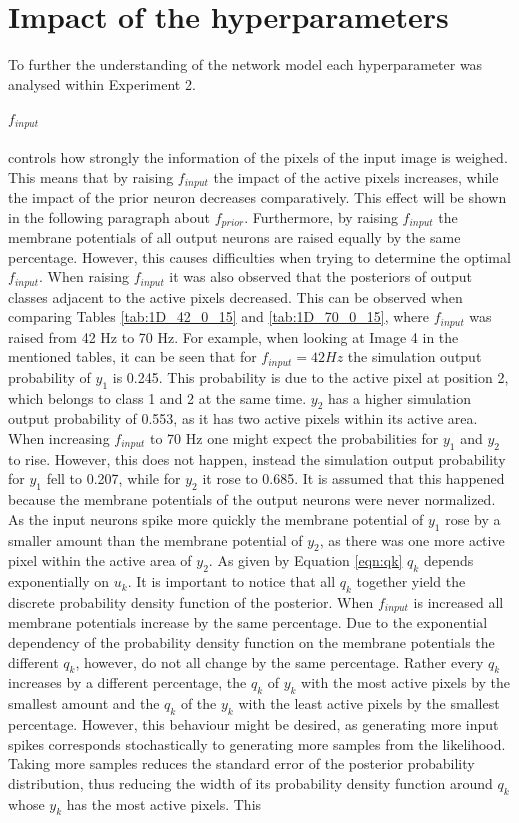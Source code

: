 \section{Impact of the hyperparameters}
\label{section:impactHyper}

To further the understanding of the network model each hyperparameter was analysed within Experiment 2.

\paragraph{$f_{input}$} controls how strongly the information of the pixels of the input image is weighed. This means that by raising $f_{input}$ the impact of the active pixels increases, while the impact of the prior neuron decreases comparatively. This effect will be shown in the following paragraph about $f_{prior}$. Furthermore, by raising $f_{input}$ the membrane potentials of all output neurons are raised equally by the same percentage. However, this causes difficulties when trying to determine the optimal $f_{input}$. When raising $f_{input}$ it was also observed that the posteriors of output classes adjacent to the active pixels decreased. This can be observed when comparing Tables \ref{tab:1D_42_0_15} and \ref{tab:1D_70_0_15}, where $f_{input}$ was raised from 42 Hz to 70 Hz. For example, when looking at Image 4 in the mentioned tables, it can be seen that for $f_{input} = 42 Hz$ the simulation output probability of $y_1$ is 0.245. This probability is due to the active pixel at position 2, which belongs to class 1 and 2 at the same time. $y_2$ has a higher simulation output probability of 0.553, as it has two active pixels within its active area. When increasing $f_{input}$ to 70 Hz one might expect the probabilities for $y_1$ and $y_2$ to rise. However, this does not happen, instead the simulation output probability for $y_1$ fell to 0.207, while for $y_2$ it rose to 0.685. It is assumed that this happened because the membrane potentials of the output neurons were never normalized. As the input neurons spike more quickly the membrane potential of $y_1$ rose by a smaller amount than the membrane potential of $y_2$, as there was one more active pixel within the active area of $y_2$. As given by Equation \ref{eqn:qk} $q_k$ depends exponentially on $u_k$. It is important to notice that all $q_k$ together yield the discrete probability density function of the posterior. When $f_{input}$ is increased all membrane potentials increase by the same percentage. Due to the exponential dependency of the probability density function on the membrane potentials the different $q_k$, however, do not all change by the same percentage. Rather every $q_k$ increases by a different percentage, the $q_k$ of $y_k$ with the most active pixels by the smallest amount and the $q_k$ of the $y_k$ with the least active pixels by the smallest percentage. However, this behaviour might be desired, as generating more input spikes corresponds stochastically to generating more samples from the likelihood. Taking more samples reduces the standard error of the posterior probability distribution, thus reducing the width of its probability density function around $q_k$ whose $y_k$ has the most active pixels. This 